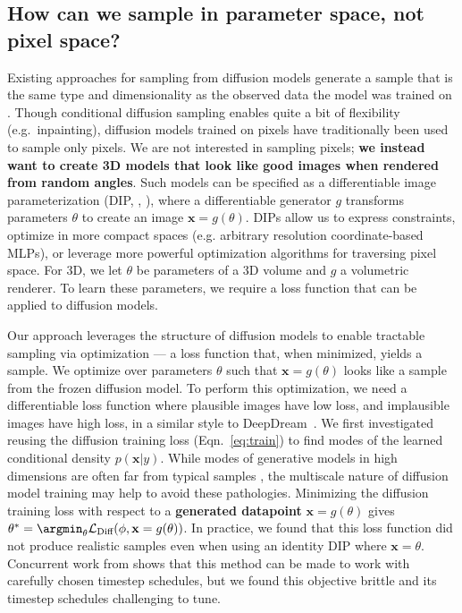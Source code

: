 \documentclass{article} %
\newcommand{\x}[0]{\mathbf{x}}
\newcommand{\ldiff}[0]{\mathcal{L}_{\text{Diff}}}
\begin{document}
\subsection{How can we sample in parameter space, not pixel space?}
Existing approaches for sampling from diffusion models generate a sample that is the same type and dimensionality as the observed data the model was trained on \citep{scoresde, ddim}.
Though conditional diffusion sampling enables quite a bit of flexibility (e.g.\ inpainting), diffusion models trained on pixels have traditionally been used to sample only pixels.
We are not interested in sampling pixels; \textbf{we instead want to create 3D models that look like good images when rendered from random angles}. Such models can be specified as a differentiable image parameterization (DIP, \citeauthor{mordvintsev2018differentiable}, \citeyear{mordvintsev2018differentiable}), where a differentiable generator $g$ transforms parameters $\theta$ to create an image $\x=g(\theta)$. DIPs allow us to express constraints, optimize in more compact spaces (e.g. arbitrary resolution coordinate-based MLPs), or leverage more powerful optimization algorithms for traversing pixel space.  For 3D, we let $\theta$ be parameters of a 3D volume and $g$ a volumetric renderer. To learn these parameters, we require a loss function that can be applied to diffusion models.

Our approach leverages the structure of diffusion models to enable tractable sampling via optimization --- a loss function that, when minimized, yields a sample. We optimize over parameters $\theta$ such that $\x = g(\theta)$ looks like a sample from the frozen diffusion model. To perform this optimization, we need a differentiable loss function where plausible images have low loss, and implausible images have high loss, in a similar style to DeepDream~\citep{deepdream}.
We first investigated reusing the diffusion training loss (Eqn.~\ref{eq:train}) to find modes of the learned conditional density $p(\x|y)$. While modes of generative models in high dimensions are often far from typical samples \citep{mlebad}, the multiscale nature of diffusion model training may help to avoid these pathologies.  Minimizing the diffusion training loss with respect to a {\bf generated datapoint} $\x=g(\theta)$ gives $\theta^* = \argmin_{\theta} \ldiff(\phi, \x=g(\theta))$.
In practice, we found that this loss function did not produce realistic samples even when using an identity DIP where $\x=\theta$. Concurrent work from \citet{ddpmpnp} shows that this method can be made to work with carefully chosen timestep schedules, but we found this objective brittle and its timestep schedules challenging to tune. 
\end{document}
